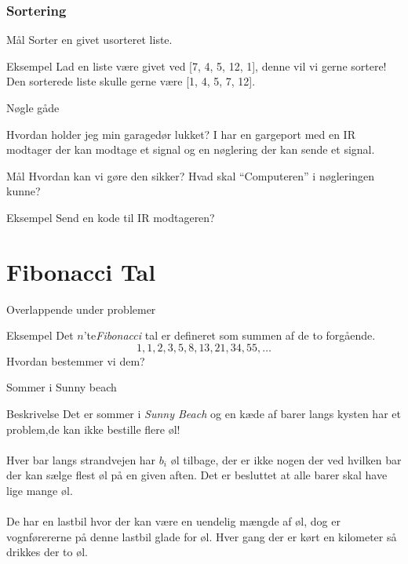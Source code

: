 \documentclass[12pt,t]{beamer}
\begin{document}
    \begin{frame}
      \frametitle{Sortering}
      \begin{block}{Mål}
          Sorter en givet usorteret liste.
      \end{block}
      \pause

      \begin{exampleblock}{Eksempel}
      Lad en liste være givet ved [7, 4, 5, 12, 1], denne vil vi gerne sortere!
      Den sorterede liste skulle gerne være [1, 4, 5, 7, 12].
      \end{exampleblock}
    \end{frame}


    \begin{frame}{Nøgle gåde}
    \begin{block}{Hvordan holder jeg min garagedør lukket?}
        I har en gargeport med en IR modtager der kan modtage et
        signal og en nøglering der kan sende et signal.
    \end{block}\pause
      \begin{block}{Mål}
        Hvordan kan vi gøre den sikker? Hvad skal ``Computeren'' i
        nøgleringen kunne?
      \end{block}
      \pause
      \begin{exampleblock}{Eksempel}
        Send en kode til IR modtageren?
      \end{exampleblock}
    \end{frame}


\section{Fibonacci Tal}
    \begin{frame}[c]{Overlappende under problemer}
        \begin{block}{Eksempel}
            Det $n$'te\emph{Fibonacci} tal er defineret som summen af de to
            forgående.
            $$
              1,1,2,3,5,8,13,21,34,55, \dots
            $$
            \pause
            Hvordan bestemmer vi dem?
        \end{block}
    \end{frame}

\begin{frame}[c]{Sommer i Sunny beach}
    \begin{block}{Beskrivelse}
      Det er sommer i \emph{Sunny Beach} og en kæde af barer langs kysten
      har et problem,\pause  de kan ikke bestille flere øl!
      \\
      \pause  ~ \\
      Hver bar langs strandvejen har $b_i$ øl tilbage, der er ikke
      nogen der ved hvilken bar der kan sælge flest øl på en given aften.
      \pause
      Det er besluttet at alle barer skal have lige mange øl. \\
      \pause
      ~\\
      De har en lastbil hvor der kan være en uendelig mængde af øl, \pause
      dog er vognførererne på denne lastbil glade for øl. Hver gang der er
      kørt en kilometer så drikkes der to øl.
    \end{block}
\end{frame}
\end{document}
